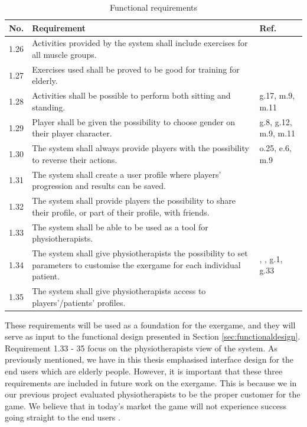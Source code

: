 \begin{table} [H]
\centering
\begin{tabular}{|>{\raggedright}p{}|p{}|p{}|}
\hline
\textbf{No.} & \textbf{Requirement} & \textbf{Ref.} \\ \hline
1.26 & Activities provided by the system shall include exercises for all muscle groups. & \cite{guidelines} \\ \hline
1.27 & Exercises used shall be proved to be good for training for elderly. & \cite{project} \cite{john2012smartsenior}\\ \hline
1.28 & Activities shall be possible to perform both sitting and standing. & g.17, m.9, m.11 \\ \hline
1.29 & Player shall be given the possibility to choose gender on their player character. &  g.8, g.12, m.9, m.11 \\ \hline
1.30 & The system shall always provide players with the possibility to reverse their actions. & o.25, e.6, m.9 \\ \hline
1.31 & The system shall create a user profile where players' progression and results can be saved. & \cite{project} \cite{john2012smartsenior} \\ \hline
1.32 & The system shall provide players the possibility to share their profile, or part of their profile, with friends. &  \cite{sweetser} \\ \hline
1.33 & The system shall be able to be used as a tool for physiotherapists. & \cite{project} \cite{john2012smartsenior}\\ \hline
1.34 & The system shall give physiotherapists the possibility to set parameters to customise the exergame for each individual patient. & \cite{project}, \cite{john2012smartsenior}, g.1, g.33  \\ \hline
1.35 & The system shall give physiotherapists access to players'/patients' profiles. & \cite{project} \cite{john2012smartsenior}\\ \hline  
\end{tabular}
\caption[Functional requirements, part 3]{Functional requirements}
\label{tab:func3}
\end{table} 

These requirements will be used as a foundation for the exergame, and they will serve as input to the functional design presented in Section \ref{sec:functionaldesign}. Requirement 1.33 - 35 focus on the physiotherapists view of the system. As previously mentioned, we have in this thesis emphasised interface design for the end users which are elderly people. However, it is important that these three requirements are included in future work on the exergame. This is because we in our previous project \cite{project} evaluated physiotherapists to be the proper customer for the game. We believe that in today's market the game will not experience success going straight to the end users \cite{project}.  

